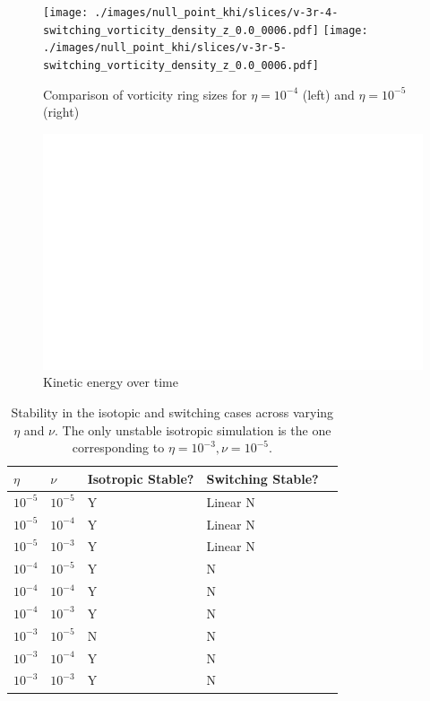 \begin{figure}[h]
  \centering
  \texttt{[image: ./images/null\_point\_khi/slices/v-3r-4-switching\_vorticity\_density\_z\_0.0\_0006.pdf]}
  \texttt{[image: ./images/null\_point\_khi/slices/v-3r-5-switching\_vorticity\_density\_z\_0.0\_0006.pdf]}
  \caption{Comparison of vorticity ring sizes for $\eta = 10^{-4}$ (left) and $\eta = 10^{-5}$ (right)}
  \label{fig:low_resistivity_voriticy_ring}
\end{figure}

\begin{figure}[h]
  \centering
  \includegraphics[width=0.8\linewidth]{./images/null_point_khi/energy_plots/parameter_study/kinetic_energy_over_time.png}
  \caption{Kinetic energy over time}%
  \label{fig:kinetic_energy_over_time_parameter}
\end{figure}

\begin{table}[]
\centering
\begin{tabular}{lllll}
$\eta$    & $\nu$     & Isotropic Stable? & Switching Stable? &  \\
\midrule
$10^{-5}$ & $10^{-5}$ & Y                 & Linear N          &  \\
$10^{-5}$ & $10^{-4}$ & Y                 & Linear N          &  \\
$10^{-5}$ & $10^{-3}$ & Y                 & Linear N          &  \\
$10^{-4}$ & $10^{-5}$ & Y                 & N                 &  \\
$10^{-4}$ & $10^{-4}$ & Y                 & N                 &  \\
$10^{-4}$ & $10^{-3}$ & Y                 & N                 &  \\
$10^{-3}$ & $10^{-5}$ & N                 & N                 &  \\
$10^{-3}$ & $10^{-4}$ & Y                 & N                 &  \\
$10^{-3}$ & $10^{-3}$ & Y                 & N                 & 
\end{tabular}
\caption{Stability in the isotopic and switching cases across varying $\eta$ and $\nu$. The only unstable isotropic simulation is the one corresponding to $\eta = 10^{-3}, \nu = 10^{-5}$.}
\label{tab:stability}
\end{table}

